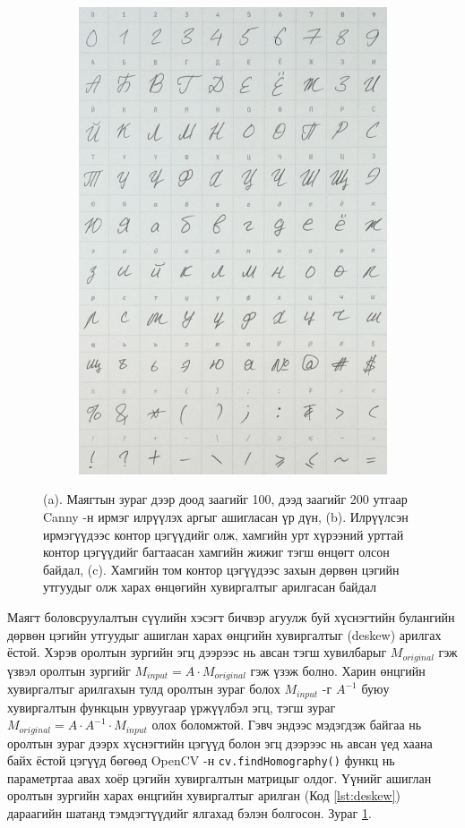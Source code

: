 \begin{figure}[ht]
\begin{subfigure}{0.32\textwidth}
		\includegraphics[width=0.85\linewidth]{images/sheet_final_transformed}
		\caption{}
		\label{fig:sheet_final_transformed}
	\end{subfigure}
	\caption{(a). Маягтын зураг дээр доод заагийг 100, дээд заагийг 200 утгаар Canny -н ирмэг илрүүлэх аргыг ашигласан үр дүн, (b). Илрүүлсэн ирмэгүүдээс контор цэгүүдийг олж, хамгийн урт хүрээний урттай контор цэгүүдийг багтаасан хамгийн жижиг тэгш өнцөгт олсон байдал, (c). Хамгийн том контор цэгүүдээс захын дөрвөн цэгийн утгуудыг олж харах өнцөгийн хувиргалтыг арилгасан байдал}
	\label{fig:sheet_processing}
\end{figure}

Маягт боловсруулалтын сүүлийн хэсэгт бичвэр агуулж буй хүснэгтийн булангийн дөрвөн цэгийн утгуудыг ашиглан харах өнцгийн хувиргалтыг (deskew) арилгах ёстой. Хэрэв оролтын зургийн эгц дээрээс нь авсан тэгш хувилбарыг $M_{original}$ гэж үзвэл оролтын зургийг $M_{input} = A \cdot M_{original}$ гэж үзэж болно. Харин өнцгийн хувиргалтыг арилгахын тулд оролтын зураг болох $M_{input}$ -г $A^{-1}$ буюу хувиргалтын функцын урвуугаар үржүүлбэл эгц, тэгш зураг $M_{original} = A \cdot A^{-1} \cdot M_{input}$ олох боломжтой. Гэвч эндээс мэдэгдэж байгаа нь оролтын зураг дээрх хүснэгтийн цэгүүд болон эгц дээрээс нь авсан үед хаана байх ёстой цэгүүд бөгөөд OpenCV -н \texttt{cv.findHomography()} функц нь параметртаа авах хоёр цэгийн хувиргалтын матрицыг олдог. Үүнийг ашиглан оролтын зургийн харах өнцгийн хувиргалтыг арилган (Код \ref{lst:deskew}) дараагийн шатанд тэмдэгтүүдийг ялгахад бэлэн болгосон. Зураг \ref{fig:sheet_final_transformed}.

